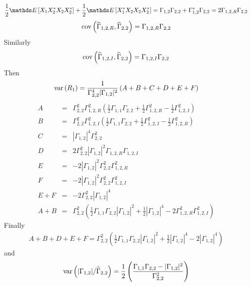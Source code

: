 \begin{eqnarray*}
\frac{1}{2}\esp{X_{1}X_{2}^{*} X_{2}X_{2}^{*}}
+
\frac{1}{2}\esp{X_{1}^{*}X_{2} X_{2}X_{2}^{*}}
=\Gamma_{1,2}\Gamma_{2,2}+\Gamma_{1,2}^{*}\Gamma_{2,2}
=
2\Gamma_{1,2,R}\Gamma_{2,2}
\end{eqnarray*}
\begin{eqnarray*}
 \mathrm{cov}\left( \widehat\Gamma_{1,2,R},\widehat\Gamma_{2,2} \right)=
 \Gamma_{1,2,R}\Gamma_{2,2}
\end{eqnarray*}
Similarly
\begin{eqnarray*}
 \mathrm{cov}\left( \widehat\Gamma_{1,2,I},\widehat\Gamma_{2,2} \right)=
 \Gamma_{1,2,I}\Gamma_{2,2}
\end{eqnarray*}
Then
\begin{eqnarray}
 \mathrm{var}\left( R_{1} \right) = \frac{1}{\Gamma_{2,2}^{4}|\Gamma_{1,2}|^{2}}
 \left(
 A+B+C+D+E+F
 \right)
\end{eqnarray}
\begin{eqnarray*}
 A &=&\Gamma_{2,2}^{2}\Gamma_{1,2,R}^{2}
 \left(
  \frac{1}{2}\Gamma_{1,1}\Gamma_{2,2}+\frac{1}{2}\Gamma_{1,2,R}^{2}-\frac{1}{2}\Gamma_{1,2,I}^{2}
  \right)
\\
 B &=&\Gamma_{2,2}^{2}\Gamma_{1,2,I}^{2}
 \left(
\frac{1}{2}\Gamma_{1,1}\Gamma_{2,2}+\frac{1}{2} \Gamma_{1,2,I}^{2}-\frac{1}{2}\Gamma_{1,2,R}^{2}
   \right)
\\
 C &=& |\Gamma_{1,2}|^{4}\Gamma_{2,2}^{2}
\\
 D &=& 2\Gamma_{2,2}^{2}|\Gamma_{1,2}|^{2}\Gamma_{1,2,R}\Gamma_{1,2,I}
\\
 E &=& -2|\Gamma_{1,2}|^{2}\Gamma_{2,2}^{2}\Gamma_{1,2,R}^{2}
\\
 F &=& -2|\Gamma_{1,2}|^{2}\Gamma_{2,2}^{2}\Gamma_{1,2,I}^{2}
\\
 E+F &=& -2\Gamma_{2,2}^{2}|\Gamma_{1,2}|^{4}
\\
 A+B &=& \Gamma_{2,2}^{2}
 \left(
 \frac{1}{2}\Gamma_{1,1}\Gamma_{2,2}|\Gamma_{1,2}|^{2}
 +
 \frac{1}{2}|\Gamma_{1,2}|^{4}
 -2\Gamma_{1,2,R}^{2}\Gamma_{1,2,I}^{2}
 \right)
\end{eqnarray*}
Finally
\begin{eqnarray*}
 A+B+D+E+F = \Gamma_{2,2}^{2}
 \left(
 \frac{1}{2}\Gamma_{1,1}\Gamma_{2,2}|\Gamma_{1,2}|^{2}
 +
 \frac{1}{2}|\Gamma_{1,2}|^{4}-2|\Gamma_{1,2}|^{4}
 \right)
\end{eqnarray*}
and
\begin{eqnarray*}
 \mathrm{var}\left( |\Gamma_{1,2}|/\widehat\Gamma_{2,2} \right) =\frac{1}{2}
 \left(
  \frac{\Gamma_{1,1}\Gamma_{2,2}-|\Gamma_{1,2}|^{2}}
  {\Gamma_{2,2}^{2}}
 \right)
\end{eqnarray*} 
 
